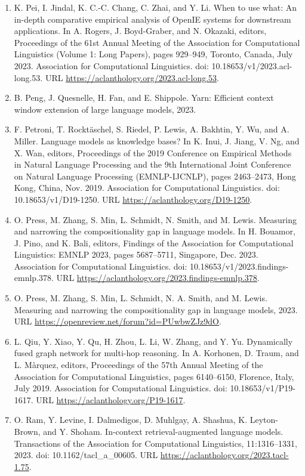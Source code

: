 \documentclass[11pt,UTF8,fontset=fandol]{ctexart}
\begin{document}
\begin{enumerate}[leftmargin=2em]
\item K. Pei, I. Jindal, K. C.-C. Chang, C. Zhai, and Y. Li. When to use what: An in-depth comparative empirical analysis of OpenIE systems for downstream applications. In A. Rogers, J. Boyd-Graber, and N. Okazaki, editors, Proceedings of the 61st Annual Meeting of the Association for Computational Linguistics (Volume 1: Long Papers), pages 929--949, Toronto, Canada, July 2023. Association for Computational Linguistics. doi: 10.18653/v1/2023.acl-long.53. URL \url{https://aclanthology.org/2023.acl-long.53}.
\item B. Peng, J. Quesnelle, H. Fan, and E. Shippole. Yarn: Efficient context window extension of large language models, 2023.
\item F. Petroni, T. Rockt\"aschel, S. Riedel, P. Lewis, A. Bakhtin, Y. Wu, and A. Miller. Language models as knowledge bases? In K. Inui, J. Jiang, V. Ng, and X. Wan, editors, Proceedings of the 2019 Conference on Empirical Methods in Natural Language Processing and the 9th International Joint Conference on Natural Language Processing (EMNLP-IJCNLP), pages 2463--2473, Hong Kong, China, Nov. 2019. Association for Computational Linguistics. doi: 10.18653/v1/D19-1250. URL \url{https://aclanthology.org/D19-1250}.
\item O. Press, M. Zhang, S. Min, L. Schmidt, N. Smith, and M. Lewis. Measuring and narrowing the compositionality gap in language models. In H. Bouamor, J. Pino, and K. Bali, editors, Findings of the Association for Computational Linguistics: EMNLP 2023, pages 5687--5711, Singapore, Dec. 2023. Association for Computational Linguistics. doi: 10.18653/v1/2023.findings-emnlp.378. URL \url{https://aclanthology.org/2023.findings-emnlp.378}.
\item O. Press, M. Zhang, S. Min, L. Schmidt, N. A. Smith, and M. Lewis. Measuring and narrowing the compositionality gap in language models, 2023. URL \url{https://openreview.net/forum?id=PUwbwZJz9dO}.
\item L. Qiu, Y. Xiao, Y. Qu, H. Zhou, L. Li, W. Zhang, and Y. Yu. Dynamically fused graph network for multi-hop reasoning. In A. Korhonen, D. Traum, and L. M\`arquez, editors, Proceedings of the 57th Annual Meeting of the Association for Computational Linguistics, pages 6140--6150, Florence, Italy, July 2019. Association for Computational Linguistics. doi: 10.18653/v1/P19-1617. URL \url{https://aclanthology.org/P19-1617}.
\item O. Ram, Y. Levine, I. Dalmedigos, D. Muhlgay, A. Shashua, K. Leyton-Brown, and Y. Shoham. In-context retrieval-augmented language models. Transactions of the Association for Computational Linguistics, 11:1316--1331, 2023. doi: 10.1162/tacl\_a\_00605. URL \url{https://aclanthology.org/2023.tacl-1.75}.

\end{enumerate}
\end{document}
